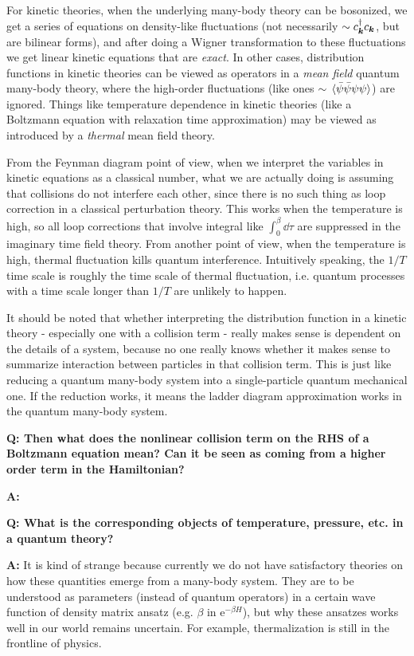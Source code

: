 \documentclass[hyperref, a4paper]{article}
\newcommand*{\ee}{\mathrm{e}}
\newenvironment{qanda}{\setlength{\parindent}{0pt}}{\bigskip}
\newcommand{\Q}{\bigskip\bfseries Q: }
\newcommand{\A}{\par\textbf{A:} \normalfont}
\begin{document}
\begin{qanda}
For kinetic theories, when the underlying many-body theory can be bosonized, we get a series of equations  
on density-like fluctuations (not necessarily $\sim c_{\vb*{k}}^\dagger c_{\vb*{k}}$, but are bilinear forms), 
and after doing a Wigner transformation to these fluctuations we get linear kinetic equations that are \emph{exact}.
In other cases, distribution functions in kinetic theories can be viewed as operators in a \emph{mean field} 
quantum many-body theory, where the high-order fluctuations (like ones 
$\sim \expval*{\bar{\psi} \bar{\psi} \psi \psi}$) are ignored. Things like temperature dependence in kinetic 
theories (like a Boltzmann equation with relaxation time approximation) may be viewed as introduced by 
a \emph{thermal} mean field theory.

From the Feynman diagram point of view, when we interpret the variables in kinetic equations as a 
classical number, what we are actually doing is assuming that collisions do not interfere each other, 
since there is no such thing as loop correction in a classical perturbation theory. 
This works when the temperature is high, so all loop corrections that involve integral like $\int_0^\beta \dd{\tau}$
are suppressed in the imaginary time field theory. 
From another point of view, when the temperature is high, thermal fluctuation kills quantum interference. 
Intuitively speaking, the $1/T$ time scale is roughly the time scale of thermal fluctuation, 
i.e. quantum processes with a time scale longer than $1/T$ are unlikely to happen.

It should be noted that whether interpreting the distribution function in a kinetic theory - especially one with
a collision term - really makes sense is dependent on the details of a system, because no one really knows 
whether it makes sense to summarize interaction between particles in that collision term.
This is just like reducing a quantum many-body system into a single-particle quantum mechanical one.
If the reduction works, it means the ladder diagram approximation works in the quantum many-body system.

\Q Then what does the nonlinear collision term on the RHS of a Boltzmann equation mean? Can it be seen as coming 
from a higher order term in the Hamiltonian?
\A 

\Q What is the corresponding objects of temperature, pressure, etc. in a quantum theory?
\A It is kind of strange because currently we do not have satisfactory theories on how these quantities emerge 
from a many-body system. They are to be understood as parameters (instead of quantum operators) in a certain wave function of density matrix 
ansatz (e.g. $\beta$ in $\ee^{- \beta H}$), but why these ansatzes works well in our world remains uncertain.
For example, thermalization is still in the frontline of physics. 


\end{qanda}
\end{document}
